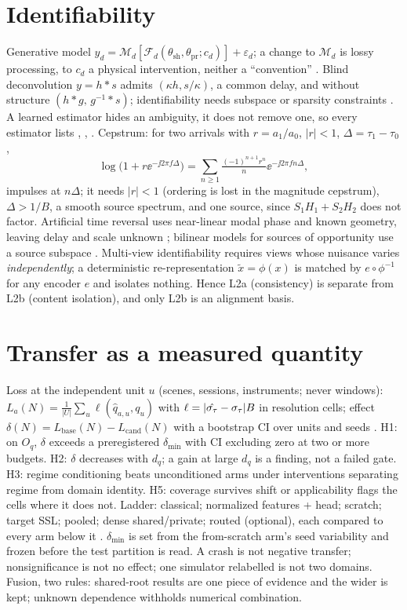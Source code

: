 \documentclass[10pt,a4paper]{article}
\begin{document}
\section{Identifiability}
Generative model $y_d=\mathcal M_d[\mathcal F_d(\theta_{\mathrm{sh}},\theta_{\mathrm{pr}};c_d)]+\varepsilon_d$; a change to $\mathcal M_d$ is lossy processing, to $c_d$ a physical intervention, neither a ``convention'' \tagG{}. Blind deconvolution $y=h*s$ admits $(\kappa h,s/\kappa)$, a common delay, and without structure $(h*g,\,g^{-1}*s)$; identifiability needs subspace or sparsity constraints \citep{li2017}. A learned estimator hides an ambiguity, it does not remove one, so every estimator lists , ,  \tagG{}. Cepstrum: for two arrivals with $r=a_1/a_0$, $|r|<1$, $\Delta=\tau_1-\tau_0$,
\begin{equation}
  \log\big(1+r\ee^{-\jj2\pi f\Delta}\big)=\sum_{n\ge1}\tfrac{(-1)^{n+1}r^n}{n}\ee^{-\jj2\pi fn\Delta},
\end{equation}
impulses at $n\Delta$; it needs $|r|<1$ (ordering is lost in the magnitude cepstrum), $\Delta>1/B$, a smooth source spectrum, and one source, since $S_1H_1+S_2H_2$ does not factor. Artificial time reversal uses near-linear modal phase and known geometry, leaving delay and scale unknown \citep{sabra2004,sabra2010}; bilinear models for sources of opportunity use a source subspace \citep{tian2020}. Multi-view identifiability \citep{vonkugelgen2021,gresele2020} requires views whose nuisance varies \emph{independently}; a deterministic re-representation $\tilde x=\phi(x)$ is matched by $e\circ\phi^{-1}$ for any encoder $e$ and isolates nothing. Hence L2a (consistency) is separate from L2b (content isolation), and only L2b is an alignment basis.

\section{Transfer as a measured quantity}
Loss at the independent unit $u$ (scenes, sessions, instruments; never windows): $L_a(N)=\frac1{|U|}\sum_u\ell(\hat q_{a,u},q_u)$ with $\ell=|\hat{\sigma_{\tau}}-\sigma_{\tau}|B$ in resolution cells; effect $\delta(N)=L_{\mathrm{base}}(N)-L_{\mathrm{cand}}(N)$ with a bootstrap CI over units and seeds \tagG{}. H1: on $O_q$, $\delta$ exceeds a preregistered $\delta_{\min}$ with CI excluding zero at two or more budgets. H2: $\delta$ decreases with $d_q$; a gain at large $d_q$ is a finding, not a failed gate. H3: regime conditioning beats unconditioned arms under interventions separating regime from domain identity. H5: coverage survives shift or applicability flags the cells where it does not. Ladder: classical; normalized features + head; scratch; target SSL; pooled; dense shared/private; routed (optional), each compared to every arm below it \citep{chu2026,sharma2026,gulrajani2020}. $\delta_{\min}$ is set from the from-scratch arm's seed variability and frozen before the test partition is read. A crash is not negative transfer; nonsignificance is not no effect; one simulator relabelled is not two domains. Fusion, two rules: shared-root results are one piece of evidence and the wider is kept; unknown dependence withholds numerical combination.
\end{document}
